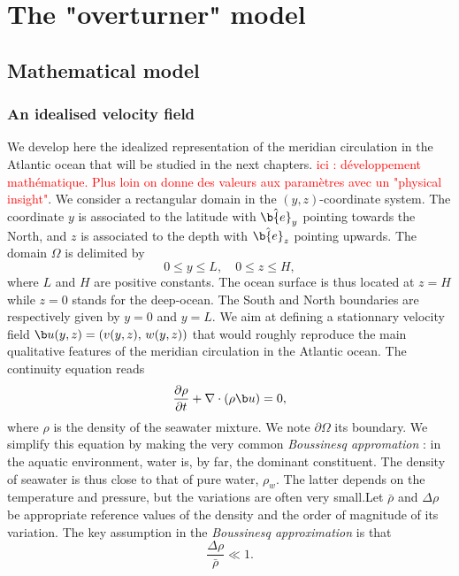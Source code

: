 \chapter{The "overturner" model}
\section{Mathematical model}
\subsection{An idealised velocity field}
We develop here the idealized representation of the meridian circulation in the Atlantic ocean that will be studied in the next chapters. \textcolor{red}{ici : développement mathématique. Plus loin on donne des valeurs aux paramètres avec un "physical insight"}. We consider a rectangular domain in the $(y,z)$-coordinate system. The coordinate $y$ is associated to the latitude with $\hat{\b{e}}_y$ pointing towards the North, and $z$ is associated to the depth with $\hat{\b{e}}_z$ pointing upwards. The domain $\Omega$ is delimited by
\begin{equation} 
	0 \le y \le L,\quad 0 \le z \le H,
\end{equation}
where $L$ and $H$ are positive constants. The ocean surface is thus located at $z = H$ while $z = 0$ stands for the deep-ocean. The South and North boundaries are respectively given by $y = 0$ and $y = L$. We aim at defining a stationnary velocity field $\b u(y,z) = (v(y,z),\, w(y,z))$ that would roughly reproduce the main qualitative features of the meridian circulation in the Atlantic ocean. The continuity equation reads
\begin{equation} \label{eq:continuity}
	\frac{\partial \rho}{\partial t} + \nabla \cdot (\rho \b u) = 0,
\end{equation}
where $\rho$ is the density of the seawater mixture. We note $\partial \Omega$ its boundary. We simplify this equation by making the very common \textit{Boussinesq appromation} : in the aquatic environment, water is, by far, the dominant constituent. The density of seawater is thus close to that of pure water, $\rho_w$. The latter depends on the temperature and pressure, but the variations are often very small.Let $\bar{\rho}$ and $\Delta\rho$ be appropriate reference values of the density and the order of magnitude of its variation. The key assumption in the \textit{Boussinesq approximation} is that
\begin{equation} \label{eq:bouss_hyp}
	\frac{\Delta \rho}{\bar{\rho}} \ll 1.
\end{equation}
